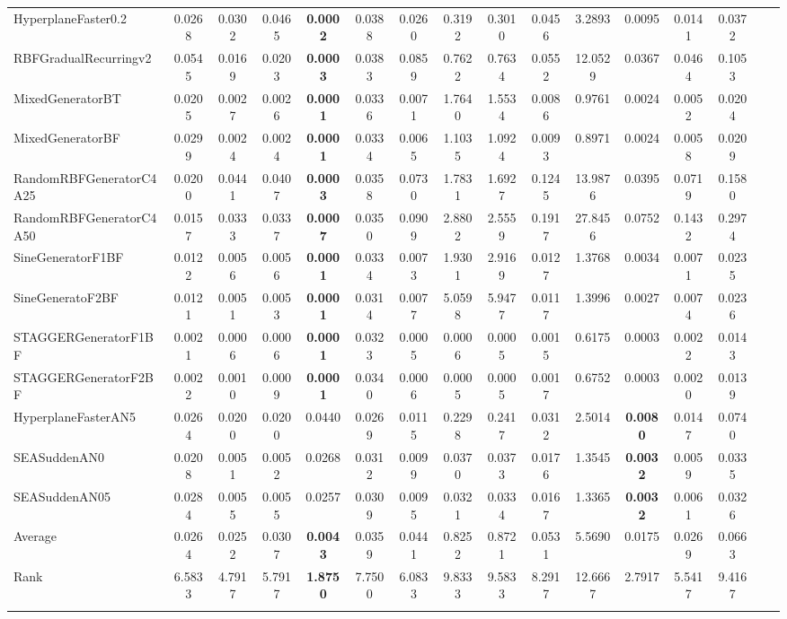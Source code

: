 \documentclass[reqno]{vcuthesis}
\numberwithin{equation}{chapter}
\begin{document}
\begin{table}[t!]
{\begin{tabularx}{1.55\textwidth}{l@{\extracolsep{\fill}}ccccccccccccccc}
HyperplaneFaster0.2 &0.0268 &0.0302 &0.0465 &\textbf{0.0002} &0.0388 &0.0260 &0.3192 &0.3010 &0.0456 &3.2893 &0.0095 &0.0141 &0.0372 &  \\
RBFGradualRecurringv2 &0.0545 &0.0169 &0.0203 &\textbf{0.0003} &0.0383 &0.0859 &0.7622 &0.7634 &0.0552 &12.0529 &0.0367 &0.0464 &0.1053 &  \\
MixedGeneratorBT &0.0205 &0.0027 &0.0026 &\textbf{0.0001} &0.0336 &0.0071 &1.7640 &1.5534 &0.0086 &0.9761 &0.0024 &0.0052 &0.0204 &  \\
MixedGeneratorBF &0.0299 &0.0024 &0.0024 &\textbf{0.0001} &0.0334 &0.0065 &1.1035 &1.0924 &0.0093 &0.8971 &0.0024 &0.0058 &0.0209 &  \\
RandomRBFGeneratorC4A25 &0.0200 &0.0441 &0.0407 &\textbf{0.0003} &0.0358 &0.0730 &1.7831 &1.6927 &0.1245 &13.9876 &0.0395 &0.0719 &0.1580 &  \\
RandomRBFGeneratorC4A50 &0.0157 &0.0333 &0.0337 &\textbf{0.0007} &0.0350 &0.0909 &2.8802 &2.5559 &0.1917 &27.8456 &0.0752 &0.1432 &0.2974 &  \\
SineGeneratorF1BF &0.0122 &0.0056 &0.0056 &\textbf{0.0001} &0.0334 &0.0073 &1.9301 &2.9169 &0.0127 &1.3768 &0.0034 &0.0071 &0.0235 &  \\
SineGeneratoF2BF &0.0121 &0.0051 &0.0053 &\textbf{0.0001} &0.0314 &0.0077 &5.0598 &5.9477 &0.0117 &1.3996 &0.0027 &0.0074 &0.0236 &  \\
STAGGERGeneratorF1BF &0.0021 &0.0006 &0.0006 &\textbf{0.0001} &0.0323 &0.0005 &0.0006 &0.0005 &0.0015 &0.6175 &0.0003 &0.0022 &0.0143 &  \\
STAGGERGeneratorF2BF &0.0022 &0.0010 &0.0009 &\textbf{0.0001} &0.0340 &0.0006 &0.0005 &0.0005 &0.0017 &0.6752 &0.0003 &0.0020 &0.0139 &  \\
HyperplaneFasterAN5 &0.0264 &0.0200 &0.0200 &0.0440 &0.0269 &0.0115 &0.2298 &0.2417 &0.0312 &2.5014 &\textbf{0.0080} &0.0147 &0.0740 &  \\
SEASuddenAN0 &0.0208 &0.0051 &0.0052 &0.0268 &0.0312 &0.0099 &0.0370 &0.0373 &0.0176 &1.3545 &\textbf{0.0032} &0.0059 &0.0335 &  \\
SEASuddenAN05 &0.0284 &0.0055 &0.0055 &0.0257 &0.0309 &0.0095 &0.0321 &0.0334 &0.0167 &1.3365 &\textbf{0.0032} &0.0061 &0.0326 &  \\
\noalign{\smallskip}\hline\noalign{\smallskip}
Average &0.0264 &0.0252 &0.0307 &\textbf{0.0043} &0.0359 &0.0441 &0.8252 &0.8721 &0.0531 &5.5690 &0.0175 &0.0269 &0.0663 &  \\
Rank &6.5833 &4.7917 &5.7917 &\textbf{1.8750} &7.7500 &6.0833 &9.8333 &9.5833 &8.2917 &12.6667 &2.7917 &5.5417 &9.4167 &  \\
\noalign{\smallskip}\hline\noalign{\smallskip}
\end{tabularx}}
\begin{minipage}{0.9\textwidth}
\centering
{}
\end{minipage}
\end{table}
\end{document}
